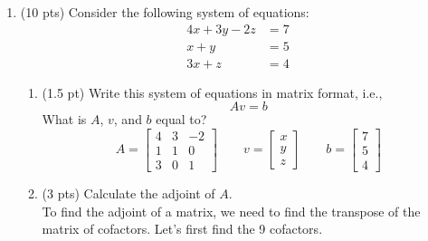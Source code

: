 \documentclass{./../../Latex/tests}
\begin{document}
\begin{enumerate}
\item (10 pts) Consider the following system of equations:
\begin{align*}
4 x + 3y -2z & = 7 \\
x+y & = 5 \\
3x+z &= 4	
\end{align*}
\begin{enumerate}
  \item (1.5 pt) Write this system of equations in matrix format, i.e., $$ Av=b $$
  What is $A$, $v$, and $b$ equal to?
$$ A = \begin{bmatrix}
	4 & 3 & -2 \\
	1 & 1 & 0 \\
	3 & 0 & 1 
\end{bmatrix} \quad \quad
v = \begin{bmatrix}
	x \\ y \\ z
\end{bmatrix} \quad \quad 
b = \begin{bmatrix}
	7 \\ 5 \\ 4
\end{bmatrix}$$ 
   \item (3 pts) Calculate the adjoint of $A$. \\
    
To find the adjoint of a matrix, we need to find the transpose of the matrix of cofactors. Let's first find the 9 cofactors. 


\end{enumerate}
\end{enumerate}
\end{document}
